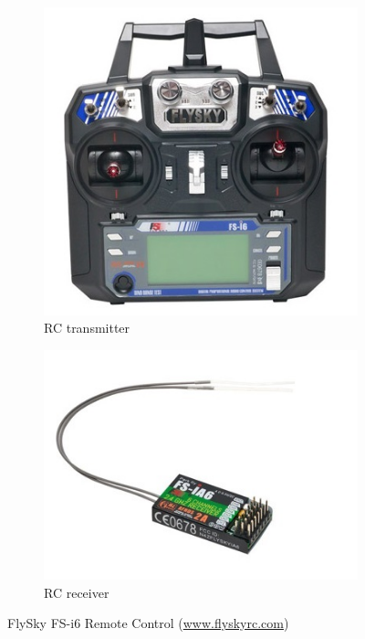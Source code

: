 \begin{figure}[htbp]
	\centering
	\begin{subfigure}[b]{0.25\textwidth}
		\includegraphics[width=\textwidth]{./figures/RCtransmitter.jpg}
		\caption{RC transmitter}
		\label{fig:RCtransmitter}
	\end{subfigure}
	\hspace{5mm}
	\begin{subfigure}[b]{0.3\textwidth}
		\includegraphics[width=\textwidth]{./figures/RCreceiver.jpg}
		\caption{RC receiver}
		\label{fig:RCreceiver}
	\end{subfigure}
	\caption{FlySky FS-i6 Remote Control (\footnotesize{\url{www.flyskyrc.com}})}
\end{figure}

